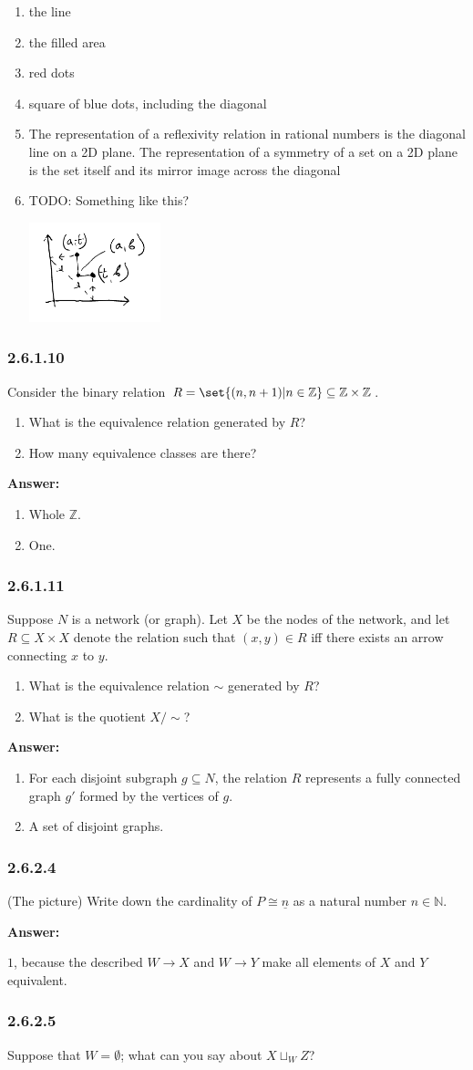 \documentclass{article}
\newcommand{\N}{\mathbb{N}}
\newcommand{\Z}{\mathbb{Z}}
\newcommand{\vsp}[0]{\vspace*{10pt}\par}
\newcommand{\exercise}[1]{\subsubsection*{#1}}
\newcommand{\ans}[0]{\vsp\textbf{Answer: }\vsp}
\newcommand{\ei}{\item}
\newcommand{\eb}{\begin{enumerate}[label=(\alph*)]\ei}
\newcommand{\ee}{\end{enumerate}}
\begin{document}
\eb the line
\ei the filled area
\ei red dots
\ei square of blue dots, including the diagonal
\ei The representation of a reflexivity relation in rational numbers is the diagonal line on a 2D
    plane. The representation of a symmetry of a set on a 2D plane is the set itself and its mirror
    image across the diagonal
\ei TODO: Something like this?
    \begin{center}
    \includegraphics[width=0.3\textwidth]{img/heuristic.png}
    \end{center}
\ee

\exercise{2.6.1.10}

Consider the binary relation $R = \set{(n,n+1)|n\in\Z}\subseteq\Z\times\Z$.

\eb What is the equivalence relation generated by $R$?
\ei How many equivalence classes are there?
\ee

\ans

\eb Whole $\Z$.
\ei One.
\ee

\exercise{2.6.1.11}

Suppose $N$ is a network (or graph). Let $X$ be the nodes of the network, and
let $R \subseteq X \times X$ denote the relation such that $(x, y) \in R$ iff
there exists an arrow connecting $x$ to $y$.

\eb What is the equivalence relation $\sim$ generated by $R$?
\ei What is the quotient $X/\sim$?
\ee

\ans

\eb For each disjoint subgraph $g \subseteq N$, the relation $R$ represents a
    fully connected graph $g'$ formed by the vertices of $g$.
\ei A set of disjoint graphs.
\ee

\exercise{2.6.2.4}

(The picture) Write down the cardinality of $P \cong \underline{n}$ as a natural
number $n \in \N$.

\ans

$1$, because the described $W \to X$ and $W \to Y$ make all elements of $X$ and
$Y$ equivalent.

\exercise{2.6.2.5}

Suppose that $W = \emptyset$; what can you say about $X \sqcup_W Z$?
\end{document}
